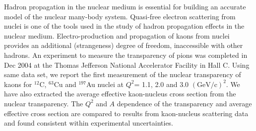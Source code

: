 
Hadron propagation in the nuclear medium is essential for building an accurate model of the nuclear many-body system. Quasi-free electron scattering from nuclei is one of the tools used in the study of hadron propagation effects in the nuclear medium. Electro-production and propagation of kaons from nuclei provides an additional (strangeness) degree of freedom, inaccessible with other hadrons. An experiment to measure the transparency of pions was completed in Dec 2004 at the Thomas Jefferson National Accelerator Facility in Hall C. Using same data set, we report the first measurement of the nuclear transparency of kaons for $^{12}$C, $^{63}$Cu and $^{197}$Au nuclei at $Q^2$= 1.1, 2.0 and 3.0 $(\mathrm{GeV/c})^2$. We have also extracted the average effective kaon-nucleus cross section from the nuclear transparency. The $Q^2$ and $A$ dependence of the transparency and average effective cross section are compared to results from kaon-nucleus scattering data and found consistent within experimental uncertainties.
